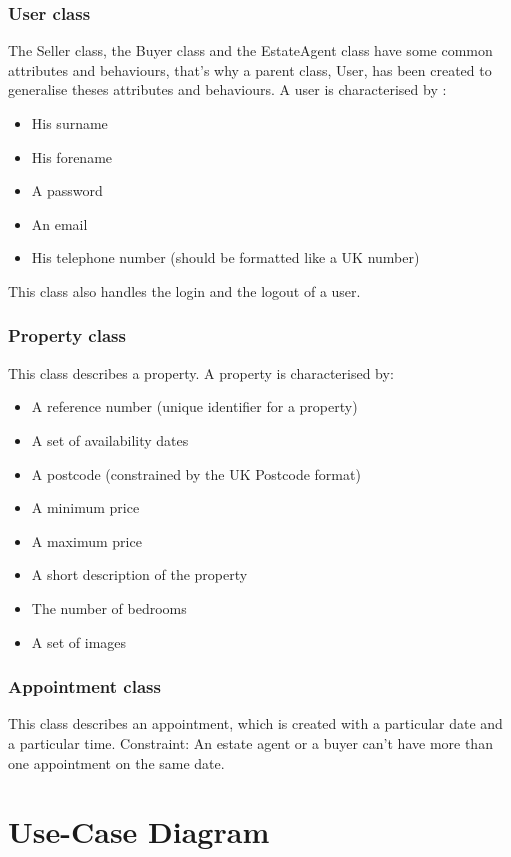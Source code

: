 \documentclass[a4paper,12pt]{article}
\begin{document}
\subsubsection{User class}
The Seller class, the Buyer class and the EstateAgent class have some common attributes and behaviours,
that's why a parent class, User, has been created to generalise theses attributes and behaviours.
A user is characterised by :
\begin{itemize}
\item His surname
\item His forename
\item A password
\item An email
\item His telephone number (should be formatted like a UK number)
\end{itemize}
This class also handles the login and the logout of a user.

\subsubsection{Property class}
This class describes a property. A property is characterised by:
\begin{itemize}
\item A reference number (unique identifier for a property)
\item A set of availability dates
\item A postcode (constrained by the UK Postcode format)
\item A minimum price
\item A maximum price
\item A short description of the property
\item The number of bedrooms
\item A set of images
\end{itemize}

\subsubsection{Appointment class}
This class describes an appointment, which is created with a particular date and a particular time.
Constraint: An estate agent or a buyer can't have more than one appointment on the same date.



\section{Use-Case Diagram}
\end{document}
